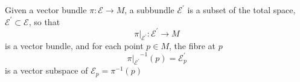 \documentclass[12pt]{article}
\begin{document}
Given a vector bundle $\pi \!:\! \mathcal E \rightarrow M$, a subbundle $\mathcal E^\prime$ is a subset of the total space, $\mathcal E^\prime \subset \mathcal E$, so that
\[ \pi\vert_{\mathcal E^\prime}\!:\! \mathcal E^\prime \rightarrow M\]
 is a vector bundle, and for each point $p\in M$, the fibre at $p$ 
\[{\pi\vert_{\mathcal E^{\prime}}}^{-1}(p) = \mathcal E^\prime_p\]
is a vector subspace of $\mathcal E_p = \pi^{-1}(p)$
\end{document}
